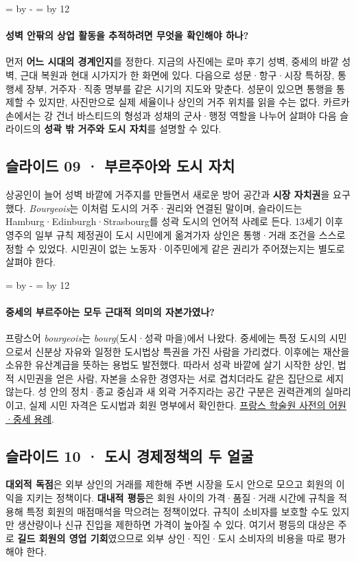 \documentclass[10pt,a4paper]{article}
\newcommand{\ReserveQuestionSpace}{%
  \par\begingroup
  \dimen0=\pagegoal \advance\dimen0 by -\pagetotal
  \dimen2=\baselineskip \multiply\dimen2 by 12
  \ifdim\dimen0<\dimen2 \newpage\fi
  \endgroup}
\begin{document}
\ReserveQuestionSpace
\paragraph{성벽 안팎의 상업 활동을 추적하려면 무엇을 확인해야 하나?}
먼저 \textbf{어느 시대의 경계인지}를 정한다. 지금의 사진에는 로마 후기 성벽, 중세의 바깥 성벽, 근대 복원과 현대 시가지가 한 화면에 있다. 다음으로 성문·항구·시장 특허장, 통행세 장부, 거주자·직종 명부를 같은 시기의 지도와 맞춘다. 성문이 있으면 통행을 통제할 수 있지만, 사진만으로 실제 세율이나 상인의 거주 위치를 읽을 수는 없다. 카르카손에서는 강 건너 바스티드의 형성과 성채의 군사·행정 역할을 나누어 살펴야 다음 슬라이드의 \textbf{성곽 밖 거주와 도시 자치}를 설명할 수 있다.\par

\subsection{슬라이드 09 · 부르주아와 도시 자치}
상공인이 늘어 성벽 바깥에 거주지를 만들면서 새로운 방어 공간과 \textbf{시장 자치권}을 요구했다. \emph{Bourgeois}는 이처럼 도시의 거주·권리와 연결된 말이며, 슬라이드는 Hamburg·Edinburgh·Strasbourg를 성곽 도시의 언어적 사례로 든다. 13세기 이후 영주의 일부 규칙 제정권이 도시 시민에게 옮겨가자 상인은 통행·거래 조건을 스스로 정할 수 있었다. 시민권이 없는 노동자·이주민에게 같은 권리가 주어졌는지는 별도로 살펴야 한다.\par

\ReserveQuestionSpace
\paragraph{중세의 부르주아는 모두 근대적 의미의 자본가였나?}
프랑스어 \emph{bourgeois}는 \emph{bourg}(도시·성곽 마을)에서 나왔다. 중세에는 특정 도시의 시민으로서 신분상 자유와 일정한 도시법상 특권을 가진 사람을 가리켰다. 이후에는 재산을 소유한 유산계급을 뜻하는 용법도 발전했다. 따라서 성곽 바깥에 살기 시작한 상인, 법적 시민권을 얻은 사람, 자본을 소유한 경영자는 서로 겹치더라도 같은 집단으로 세지 않는다. 성 안의 정치·종교 중심과 새 외곽 거주지라는 공간 구분은 권력관계의 실마리이고, 실제 시민 자격은 도시법과 회원 명부에서 확인한다. \href{https://www.dictionnaire-academie.fr/article/A9B1826}{프랑스 학술원 사전의 어원·중세 용례}.\par

\subsection{슬라이드 10 · 도시 경제정책의 두 얼굴}
\textbf{대외적 독점}은 외부 상인의 거래를 제한해 주변 시장을 도시 안으로 모으고 회원의 이익을 지키는 정책이다. \textbf{대내적 평등}은 회원 사이의 가격·품질·거래 시간에 규칙을 적용해 특정 회원의 매점매석을 막으려는 정책이었다. 규칙이 소비자를 보호할 수도 있지만 생산량이나 신규 진입을 제한하면 가격이 높아질 수 있다. 여기서 평등의 대상은 주로 \textbf{길드 회원의 영업 기회}였으므로 외부 상인·직인·도시 소비자의 비용을 따로 평가해야 한다.\par
\end{document}
